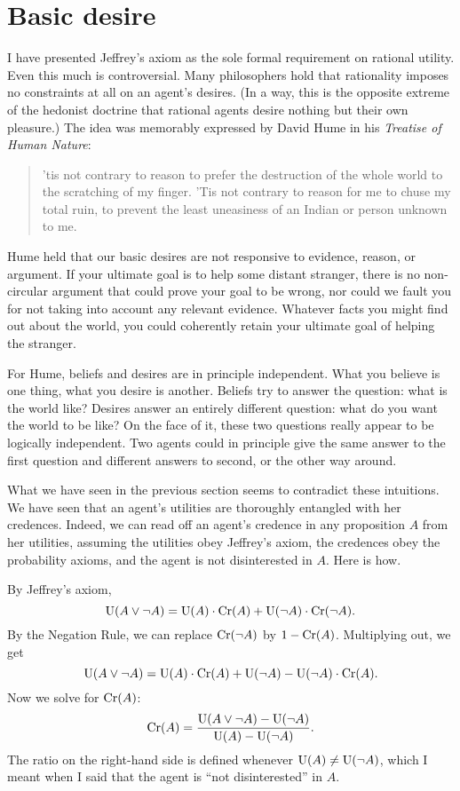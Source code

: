\section{Basic desire}\label{sec:basic-desire}

I have presented Jeffrey's axiom as the sole formal requirement on rational
utility. Even this much is controversial. Many philosophers hold that
rationality imposes no constraints at all on an agent's desires. (In a way, this
is the opposite extreme of the hedonist doctrine that rational agents desire
nothing but their own pleasure.) The idea was memorably expressed by David Hume
in his \emph{Treatise of Human Nature}:

\begin{quote}
  'tis not contrary to reason to prefer the destruction of the whole
  world to the scratching of my finger. 'Tis not contrary to reason
  for me to chuse my total ruin, to prevent the least uneasiness of an
  Indian or person unknown to me.
\end{quote}

Hume held that our basic desires are not responsive to evidence, reason, or
argument. If your ultimate goal is to help some distant stranger, there is no
non-circular argument that could prove your goal to be wrong, nor could we fault
you for not taking into account any relevant evidence. Whatever facts you might
find out about the world, you could coherently retain your ultimate goal of
helping the stranger.

For Hume, beliefs and desires are in principle independent. What you believe is
one thing, what you desire is another. Beliefs try to answer the question: what
is the world like? Desires answer an entirely different question: what do you
want the world to be like? On the face of it, these two questions really appear
to be logically independent. Two agents could in principle give the same answer
to the first question and different answers to second, or the other way around.

What we have seen in the previous section seems to contradict these intuitions.
We have seen that an agent's utilities are thoroughly entangled with her
credences. Indeed, we can read off an agent's credence in any proposition $A$
from her utilities, assuming the utilities obey Jeffrey's axiom, the credences
obey the probability axioms, and the agent is not disinterested in $A$. Here
is how.

By Jeffrey's axiom,
\[
  \text{U}(A \lor \neg A) = \text{U}(A)\cdot \text{Cr}(A) + \text{U}(\neg A)\cdot \text{Cr}(\neg A).
\]
By the Negation Rule, we can replace $\text{Cr}(\neg A)$ by $1 - \text{Cr}(A)$.
Multiplying out, we get
\[
  \text{U}(A \lor \neg A) = \text{U}(A)\cdot \text{Cr}(A) + \text{U}(\neg A) - \text{U}(\neg A)\cdot \text{Cr}(A).
\]
Now we solve for $\text{Cr}(A)$:
\[
  \text{Cr}(A) = \frac{\text{U}(A \lor \neg A) - \text{U}(\neg A)}{\text{U}(A) - \text{U}(\neg A)}.
\]
The ratio on the right-hand side is defined whenever $\text{U}(A) \not= \text{U}(\neg A)$, which I meant when I said that the agent is ``not disinterested'' in $A$.

